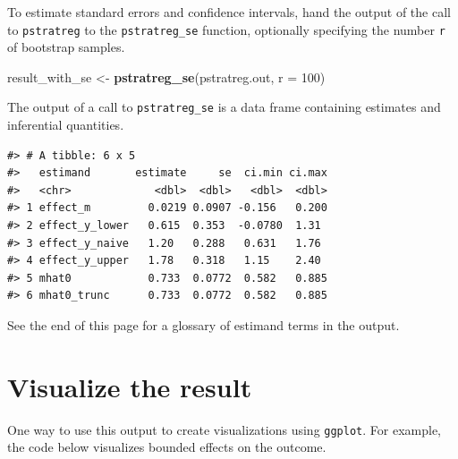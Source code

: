 \documentclass[
]{book}
\newenvironment{Shaded}{\begin{snugshade}}{\end{snugshade}}
\newcommand{\AttributeTok}[1]{\textcolor[rgb]{0.13,0.29,0.53}{#1}}
\newcommand{\DecValTok}[1]{\textcolor[rgb]{0.00,0.00,0.81}{#1}}
\newcommand{\FunctionTok}[1]{\textcolor[rgb]{0.13,0.29,0.53}{\textbf{#1}}}
\newcommand{\NormalTok}[1]{#1}
\newcommand{\OtherTok}[1]{\textcolor[rgb]{0.56,0.35,0.01}{#1}}
\begin{document}
To estimate standard errors and confidence intervals, hand the output of the call to \texttt{pstratreg} to the \texttt{pstratreg\_se} function, optionally specifying the number \texttt{r} of bootstrap samples.

\begin{Shaded}
\begin{Highlighting}[]
\NormalTok{result\_with\_se }\OtherTok{\textless{}{-}} \FunctionTok{pstratreg\_se}\NormalTok{(pstratreg.out, }\AttributeTok{r =} \DecValTok{100}\NormalTok{)}
\end{Highlighting}
\end{Shaded}

The output of a call to \texttt{pstratreg\_se} is a data frame containing estimates and inferential quantities.

\begin{verbatim}
#> # A tibble: 6 x 5
#>   estimand       estimate     se  ci.min ci.max
#>   <chr>             <dbl>  <dbl>   <dbl>  <dbl>
#> 1 effect_m         0.0219 0.0907 -0.156   0.200
#> 2 effect_y_lower   0.615  0.353  -0.0780  1.31 
#> 3 effect_y_naive   1.20   0.288   0.631   1.76 
#> 4 effect_y_upper   1.78   0.318   1.15    2.40 
#> 5 mhat0            0.733  0.0772  0.582   0.885
#> 6 mhat0_trunc      0.733  0.0772  0.582   0.885
\end{verbatim}

See the end of this page for a glossary of estimand terms in the output.

\hypertarget{visualize-the-result}{%
\section{Visualize the result}\label{visualize-the-result}}

One way to use this output to create visualizations using \texttt{ggplot}. For example, the code below visualizes bounded effects on the outcome.
\end{document}
